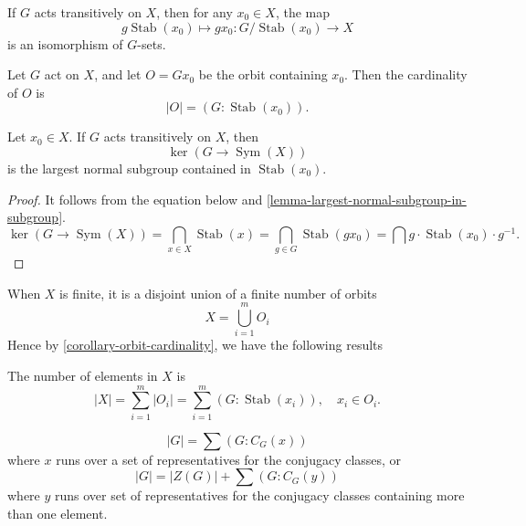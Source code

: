 \begin{proposition}
  \label{proposition-isomorphic-G-set}
  If \( G \) acts transitively on \( X \), then for any \( x_0 \in X \), the map
  \[
    g \operatorname{Stab}(x_0) \mapsto gx_0: G / \operatorname{Stab}(x_0) \to X
  \]
  is an isomorphism of \( G \)-sets.
\end{proposition}

\begin{corollary}
  \label{corollary-orbit-cardinality}
  Let \( G \) act on \( X \), and let \( O = Gx_0 \) be the orbit containing \( x_0 \).
  Then the cardinality of \( O \) is
  \[
    \left\vert O \right\vert = (G: \operatorname{Stab}(x_0)).
  \]
\end{corollary}

\begin{proposition}
  \label{proposition-largest-subgroup-in-stabilizer}
  Let \( x_0 \in X \).
  If \( G \) acts transitively on \( X \), then
  \[
    \ker (G \to \operatorname{Sym}(X))
  \]
  is the largest normal subgroup contained in \( \operatorname{Stab}(x_0) \).
\end{proposition}

\begin{proof}
  It follows from the equation below and \ref{lemma-largest-normal-subgroup-in-subgroup}.
  \[
    \ker(G \to \operatorname{Sym}(X)) = \bigcap_{x \in X} \operatorname{Stab}(x) = \bigcap_{g \in G}\operatorname{Stab}(gx_0) = \bigcap g \cdot \operatorname{Stab}(x_0) \cdot g^{-1}.
  \]
\end{proof}


When \( X \) is finite, it is a disjoint union of a finite number of orbits
\[
  X = \bigcup_{i = 1}^m O_i
\]
Hence by \ref{corollary-orbit-cardinality}, we have the following results
\begin{proposition}
  \label{proposition-decomposition-of-set-cardinality}
  The number of elements in \( X \) is
  \[
    \left\vert X \right\vert = \sum_{i = 1}^m \left\vert O_i \right\vert = \sum_{i = 1}^m (G: \operatorname{Stab}(x_i)),\quad x_i \in O_i.
  \]
\end{proposition}

\begin{proposition}
  \label{proposition-class-equation}
  \[
    \left\vert G \right\vert = \sum (G: C_G(x))
  \]
  where \( x \) runs over a set of representatives for the conjugacy classes, or
  \[
    \left\vert G \right\vert = \left\vert Z(G) \right\vert + \sum(G : C_G(y))
  \]
  where \( y \) runs over set of representatives for the conjugacy classes containing more than one element.
\end{proposition}


